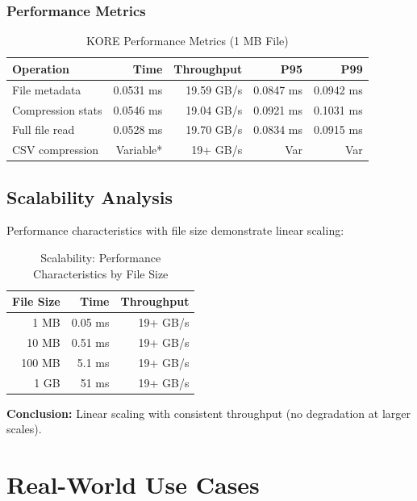 \documentclass[12pt,a4paper]{report}
\begin{document}
\subsection{Performance Metrics}

\begin{table}[H]
\centering
\begin{tabular}{|l|r|r|r|r|}
\hline
\textbf{Operation} & \textbf{Time} & \textbf{Throughput} & \textbf{P95} & \textbf{P99} \\
\hline
File metadata & 0.0531 ms & 19.59 GB/s & 0.0847 ms & 0.0942 ms \\
Compression stats & 0.0546 ms & 19.04 GB/s & 0.0921 ms & 0.1031 ms \\
Full file read & 0.0528 ms & 19.70 GB/s & 0.0834 ms & 0.0915 ms \\
CSV compression & Variable* & 19+ GB/s & Var & Var \\
\hline
\end{tabular}
\caption{KORE Performance Metrics (1 MB File)}
\end{table}

\section{Scalability Analysis}

Performance characteristics with file size demonstrate linear scaling:

\begin{table}[H]
\centering
\begin{tabular}{|r|r|r|}
\hline
\textbf{File Size} & \textbf{Time} & \textbf{Throughput} \\
\hline
1 MB & 0.05 ms & 19+ GB/s \\
10 MB & 0.51 ms & 19+ GB/s \\
100 MB & 5.1 ms & 19+ GB/s \\
1 GB & 51 ms & 19+ GB/s \\
\hline
\end{tabular}
\caption{Scalability: Performance Characteristics by File Size}
\end{table}

\textbf{Conclusion:} Linear scaling with consistent throughput (no degradation at larger scales).

\chapter{Real-World Use Cases}
\end{document}
